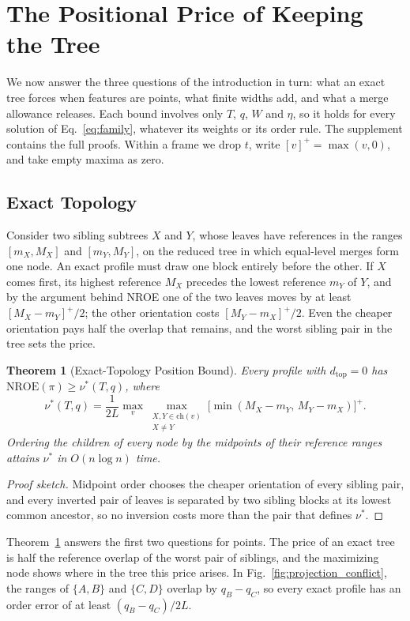\documentclass[preprint]{vgtc}   %
\newtheorem{theorem}{Theorem}
\newcommand{\dtop}{d_{\mathrm{top}}}
\newcommand{\nroe}{\mathrm{NROE}}
\begin{document}
\section{The Positional Price of Keeping the Tree}\label{sec:bounds}
We now answer the three questions of the introduction in turn: what an exact tree forces when features are points, what finite widths add, and what a merge allowance releases. Each bound involves only $T$, $q$, $W$ and $\eta$, so it holds for every solution of Eq.~\ref{eq:family}, whatever its weights or its order rule. The supplement contains the full proofs. Within a frame we drop $t$, write $[v]^+=\max(v,0)$, and take empty maxima as zero.

\subsection{Exact Topology}
Consider two sibling subtrees $X$ and $Y$, whose leaves have references in the ranges $[m_X,M_X]$ and $[m_Y,M_Y]$, on the reduced tree in which equal-level merges form one node. An exact profile must draw one block entirely before the other. If $X$ comes first, its highest reference $M_X$ precedes the lowest reference $m_Y$ of $Y$, and by the argument behind NROE one of the two leaves moves by at least $[M_X-m_Y]^+/2$; the other orientation costs $[M_Y-m_X]^+/2$. Even the cheaper orientation pays half the overlap that remains, and the worst sibling pair in the tree sets the price.
\begin{theorem}[Exact-Topology Position Bound]\label{thm:order}
Every profile with $\dtop=0$ has $\nroe(\pi)\ge\nu^*(T,q)$, where
\begin{equation}\label{eq:nu}
 \nu^*(T,q)=\frac{1}{2L}\max_v\max_{\substack{X,Y\in\mathrm{ch}(v)\\X\ne Y}}
 \bigl[\min(M_X-m_Y,\,M_Y-m_X)\bigr]^+ .
\end{equation}
Ordering the children of every node by the midpoints of their reference ranges attains $\nu^*$ in $O(n\log n)$ time.
\end{theorem}
\begin{proof}[Proof sketch]
Midpoint order chooses the cheaper orientation of every sibling pair, and every inverted pair of leaves is separated by two sibling blocks at its lowest common ancestor, so no inversion costs more than the pair that defines $\nu^*$.
\end{proof}
Theorem~\ref{thm:order} answers the first two questions for points. The price of an exact tree is half the reference overlap of the worst pair of siblings, and the maximizing node shows where in the tree this price arises. In Fig.~\ref{fig:projection_conflict}, the ranges of $\{A,B\}$ and $\{C,D\}$ overlap by $q_B-q_C$, so every exact profile has an order error of at least $(q_B-q_C)/2L$.
\end{document}
